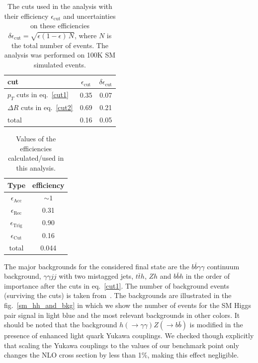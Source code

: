 \begin{table}[!t]
	\centering
	\begin{tabular}{l cc }
		\toprule
		cut  & $\epsilon_{\mathrm{cut}}$  &  $ \delta \epsilon_{\mathrm{cut}}$  \\
		\midrule
		$p_T$ cuts in eq.~\eqref{cut1} & 0.35 & 0.07\\
		$\Delta R$ cuts  in eq.~\eqref{cut2} & 0.69 & 0.21 \\
		\hline
		total    & 0.16 & 0.05 \\
		\bottomrule
	\end{tabular}
	\caption{The cuts used in the analysis with their efficiency $\epsilon_{\mathrm{cut}}$ and uncertainties on these efficiencies $ \delta \epsilon_{\mathrm{cut}} = \sqrt{\epsilon(1-\epsilon)\,N}$, where $N$ is the total number of events. The analysis was performed on 100K SM simulated events.}
	\label{cuts_eff}
\end{table}
\begin{table}[!t]
	\centering
	\begin{tabular}{ c c }
		\toprule
		Type & efficiency \\
		\midrule
		$\epsilon_{\mathrm{Acc}}$  & $\sim 1$ \\
		$\epsilon_{\mathrm{Rec}}$ & 0.31 \\
		$\epsilon_{\mathrm{Trig}}$ & 0.90 \\
		$\epsilon_{\mathrm{Cut}}$ & 0.16 \\
		\hline
		total    &  0.044\\
		\bottomrule
	\end{tabular}
	\caption{Values of the efficiencies calculated/used in this analysis. }
	\label{eff}
\end{table}
\par
The major backgrounds for the considered final state are the $b\bar{b}\gamma\gamma$ continuum background, $\gamma\gamma jj$ with two mistagged jets, $t\bar{t}h$, $Zh$ and $b\bar{b}h$ in the order of importance after the cuts in eq.~\eqref{cut1}. The number of background events (surviving the cuts) is taken from~\cite{Azatov:2015oxa}. The backgrounds are illustrated in the fig.~\ref{sm_hh_and_bkg} in which we show the number of events for the SM Higgs pair signal in light blue and the most relevant backgrounds in other colors. It should be noted that the background $h(\to \gamma \gamma) Z(\to b \bar b)$  is modified in the presence of enhanced light quark Yukawa couplings. We checked though explicitly that scaling the Yukawa couplings to the values of our benchmark point only changes the NLO cross section by less than 1\%, making this effect negligible.
